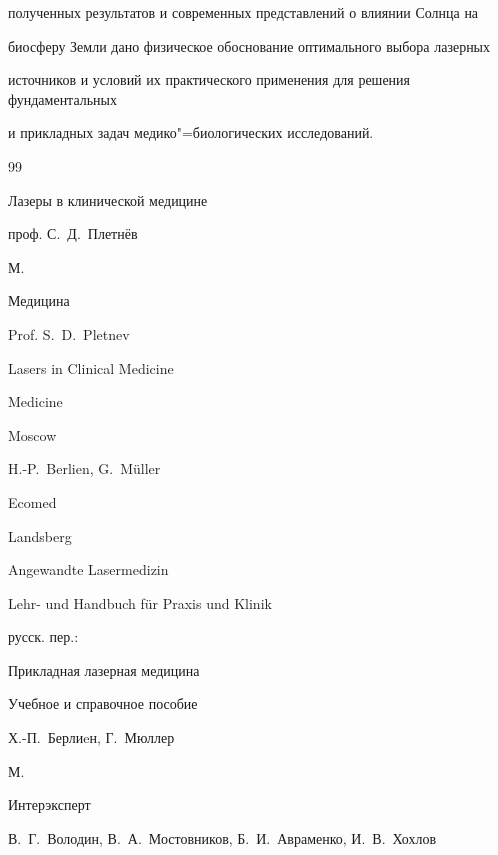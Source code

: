 полученных результатов и современных представлений о влиянии Солнца на

биосферу Земли дано физическое обоснование оптимального выбора лазерных

источников и условий их практического применения для решения фундаментальных

и прикладных задач медико"=биологических исследований.



\begin{thebibliography}{99}




\book Лазеры в клинической медицине

\ed проф. С.~Д.~Плетнёв

\publaddr М.

\publ Медицина



\misctransl

\ed Prof. S.~D.~Pletnev

\book Lasers in Clinical Medicine



\publ Medicine

\publaddr Moscow




\by H.-P.~Berlien, G.~M\"uller

\publ Ecomed

\publaddr Landsberg


\book Angewandte Lasermedizin

\bookinfo Lehr- und Handbuch f\"ur Praxis und Klinik

\rtransl русск. пер.:~

\book Прикладная лазерная медицина

\bookinfo Учебное и справочное пособие

\by  Х.-П.~Берлиeн, Г.~Мюллер 

\publaddr  М.

\publ Интерэксперт







\by  В.~Г.~Володин, В.~А.~Мостовников, Б.~И.~Авраменко, И.~В.~Хохлов


\end{thebibliography}
